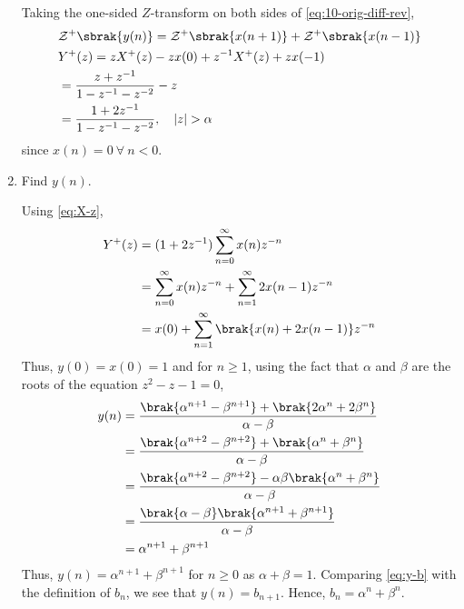 \documentclass[journal,12pt,twocolumn]{IEEEtran}
\renewcommand\thesection{\arabic{section}}
\begin{document}
\begin{enumerate}[label=\thesection.\arabic*,ref=\thesection.\theenumi]
\solution Taking the one-sided $Z$-transform on both sides of \eqref{eq:10-orig-diff-rev},
\begin{align}
&\mathcal{Z}^+\sbrak{y(n)} = \mathcal{Z}^+\sbrak{x(n + 1)} + \mathcal{Z}^+\sbrak{x(n - 1)} \\
&Y^+(z) = zX^+(z) - zx(0) + z^{-1}X^+(z) + zx(-1) \\
&= \frac{z + z^{-1}}{1 - z^{-1} - z^{-2}} - z \\
&= \frac{1 + 2z^{-1}}{1 - z^{-1} - z^{-2}}, \quad |z| > \alpha
\end{align}
since $x(n) = 0\ \forall\ n < 0$.
\item Find $y(n)$.
    \label{pr:1-3}

\solution Using \eqref{eq:X-z},
\begin{align}
    Y^+(z) &= (1 + 2z^{-1})\sum_{n = 0}^{\infty}x(n)z^{-n} \\
           &= \sum_{n = 0}^{\infty}x(n)z^{-n} + \sum_{n = 1}^{\infty}2x(n - 1)z^{-n} \\
           &= x(0) + \sum_{n = 1}^{\infty}\brak{x(n) + 2x(n - 1)}z^{-n}
\end{align}
Thus, $y(0) = x(0) = 1$ and for $n \ge 1$, using the fact that $\alpha$ and 
$\beta$ are the roots of the equation $z^2 - z - 1 = 0$,
\begin{align}
    y(n) &= \frac{\brak{\alpha^{n + 1} - \beta^{n + 1}} + \brak{2\alpha^n + 2\beta^n}}{\alpha - \beta} \\
         &= \frac{\brak{\alpha^{n + 2} - \beta^{n + 2}} + \brak{\alpha^{n} + \beta^{n}}}{\alpha - \beta} \label{eq:y-b} \\
         &= \frac{\brak{\alpha^{n + 2} - \beta^{n + 2}} - \alpha\beta\brak{\alpha^{n} + \beta^{n}}}{\alpha - \beta} \\
         &= \frac{\brak{\alpha - \beta}\brak{\alpha^{n + 1} + \beta^{n + 1}}}{\alpha - \beta} \\
         &= \alpha^{n + 1} + \beta^{n + 1}
\end{align}
Thus, $y(n) = \alpha^{n + 1} + \beta^{n + 1}$ for $n \geq 0$ as $\alpha + \beta = 1$.
Comparing \eqref{eq:y-b} with the definition of $b_n$, we see that $y(n) = b_{n + 1}$.
Hence, $b_n = \alpha^n + \beta^n$.
\end{enumerate}
\end{document}
